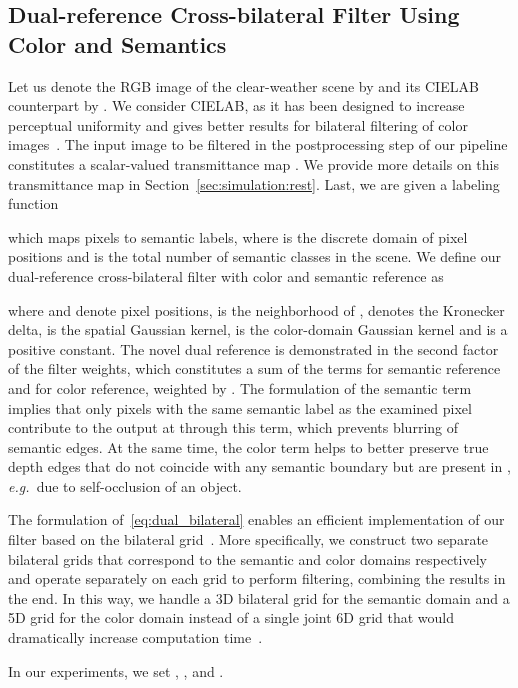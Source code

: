\documentclass[twocolumn]{svjour3}          \smartqed  \usepackage{graphicx}
\newcommand{\eg}{\mbox{\emph{e.g.\ }}}
\begin{document}
\subsection{Dual-reference Cross-bilateral Filter Using Color and Semantics}
\label{sec:simulation:dual_bilateral}

Let us denote the RGB image of the clear-weather scene by  and its CIELAB counterpart by . We consider CIELAB, as it has been designed to increase perceptual uniformity and gives better results for bilateral filtering of color images~\cite{bilateral:grid}. The input image to be filtered in the postprocessing step of our pipeline constitutes a scalar-valued transmittance map . We provide more details on this transmittance map in Section~\ref{sec:simulation:rest}. Last, we are given a labeling function

which maps pixels to semantic labels, where  is the discrete domain of pixel positions and  is the total number of semantic classes in the scene. We define our dual-reference cross-bilateral filter with color and semantic reference as


where  and  denote pixel positions,  is the neighborhood of ,  denotes the Kronecker delta,  is the spatial Gaussian kernel,  is the color-domain Gaussian kernel and  is a positive constant. The novel dual reference is demonstrated in the second factor of the filter weights, which constitutes a sum of the terms  for semantic reference and  for color reference, weighted by . The formulation of the semantic term implies that only pixels  with the same semantic label as the examined pixel  contribute to the output at  through this term, which prevents blurring of semantic edges. At the same time, the color term helps to better preserve true depth edges that do not coincide with any semantic boundary but are present in , \eg{}due to self-occlusion of an object.

The formulation of~\eqref{eq:dual_bilateral} enables an efficient implementation of our filter based on the bilateral grid~\cite{bilateral:grid}. More specifically, we construct two separate bilateral grids that correspond to the semantic and color domains respectively and operate separately on each grid to perform filtering, combining the results in the end. In this way, we handle a 3D bilateral grid for the semantic domain and a 5D grid for the color domain instead of a single joint 6D grid that would dramatically increase computation time~\cite{bilateral:grid}.

In our experiments, we set , , and .
\end{document}
